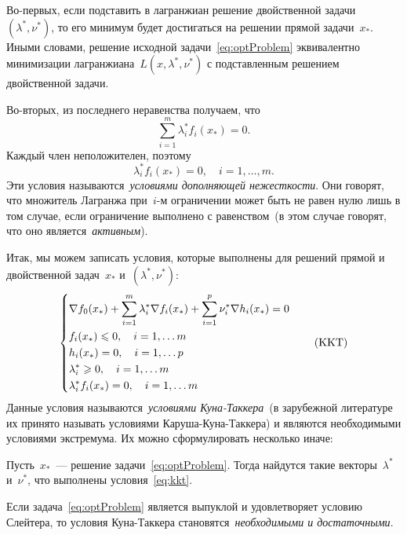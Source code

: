 \documentclass[12pt,fleqn]{article}
\begin{document}
Во-первых, если подставить в лагранжиан решение двойственной задачи~$(\lambda^*, \nu^*)$,
то его минимум будет достигаться на решении прямой задачи~$x_*$.
Иными словами, решение исходной задачи~\eqref{eq:optProblem} эквивалентно
минимизации лагранжиана~$L(x, \lambda^*, \nu^*)$
с подставленным решением двойственной задачи.

Во-вторых, из последнего неравенства получаем, что
\[
\sum_{i = 1}^{m} \lambda_i^* f_i(x_*) = 0.
\]
Каждый член неположителен, поэтому
\[
\lambda_i^* f_i(x_*) = 0, \quad i = 1, \dots, m.
\]
Эти условия называются~\emph{условиями дополняющей нежесткости}.
Они говорят, что множитель Лагранжа при~$i$-м ограничении
может быть не равен нулю лишь в том случае, если
ограничение выполнено с равенством~(в этом случае говорят,
что оно является~\emph{активным}).

Итак, мы можем записать условия, которые выполнены
для решений прямой и двойственной задач~$x_*$ и~$(\lambda^*, \nu^*)$:
\begin{equation}
\label{eq:kkt}
    \left\{
        \begin{aligned}
            & \nabla f_0(x_*)
                +
                \sum_{i = 1}^{m} \lambda_i^* \nabla f_i(x_*)
                +
                \sum_{i = 1}^{p} \nu_i^* \nabla h_i(x_*) = 0 \\
            & f_i(x_*) \leq 0, \quad i = 1, \dots m \\
            & h_i(x_*) = 0, \quad i = 1, \dots p \\
            & \lambda_i^* \geq 0, \quad i = 1, \dots m \\
            & \lambda_i^* f_i(x_*) = 0, \quad i = 1, \dots m
        \end{aligned}
    \right.
    \tag{$\text{KKT}$}
\end{equation}
Данные условия называются~\emph{условиями Куна-Таккера}~(в зарубежной
литературе их принято называть условиями Каруша-Куна-Таккера)
и являются необходимыми условиями экстремума.
Их можно сформулировать несколько иначе:
\begin{vkTheorem}
    Пусть~$x_*$~--- решение задачи~\eqref{eq:optProblem}.
    Тогда найдутся такие векторы~$\lambda^*$ и~$\nu^*$,
    что выполнены условия~\eqref{eq:kkt}.
\end{vkTheorem}

Если задача~\eqref{eq:optProblem} является выпуклой и удовлетворяет условию Слейтера,
то условия Куна-Таккера становятся~\emph{необходимыми и достаточными}.
\end{document}
